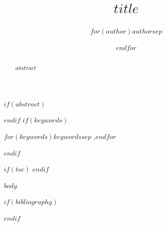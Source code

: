 \documentclass[$if(fontsize)$$fontsize$,$endif$,preprint,12pt]{elsarticle}
\title{$title$}
\author[$for(author)$$author$$sep$, $endfor$]{$for(author)$$author$$sep$ \and $endfor$}
\begin{document}
\maketitle

$if(abstract)$
\begin{abstract}
$abstract$
\end{abstract}
$endif$
$if(keywords)$
\begin{keyword}
$for(keywords)$$keywords$$sep$ \sep $endfor$
\end{keyword}
$endif$

$if(toc)$
\tableofcontents
$endif$

$body$

$if(bibliography)$


$endif$
\end{document}
